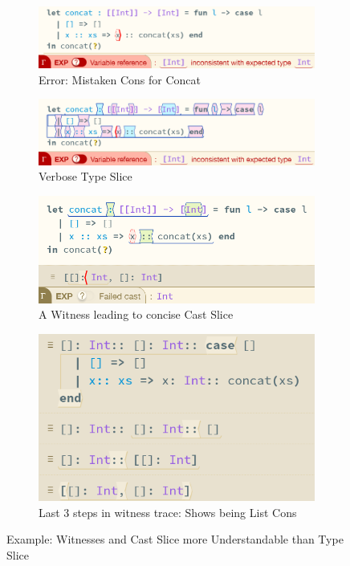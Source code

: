 \begin{figure}[H]
\centering
\begin{subfigure}{0.49\textwidth}
\centering
\includegraphics[width=1\textwidth]{Media/Figures/concat_error}
\caption{Error: Mistaken Cons for Concat}
\end{subfigure}
\begin{subfigure}{0.49\textwidth}
\centering
\includegraphics[width=1\textwidth]{Media/Figures/concat_error_type_slice}
\caption{Verbose Type Slice}
\end{subfigure}
\begin{subfigure}{0.49\textwidth}
\centering
\includegraphics[width=1\textwidth]{Media/Figures/concat_error_cast_slice}
\caption{A Witness \code{([[], []])} leading to concise Cast Slice}
\end{subfigure}
\begin{subfigure}{0.49\textwidth}
\centering
\includegraphics[width=1\textwidth]{Media/Figures/concat_error_trace}
\caption{Last 3 steps in witness trace: Shows \code{::} being List Cons}
\end{subfigure}
\caption{Example: Witnesses and Cast Slice more Understandable than Type Slice}
\label{fig:ConcatError}
\end{figure}
